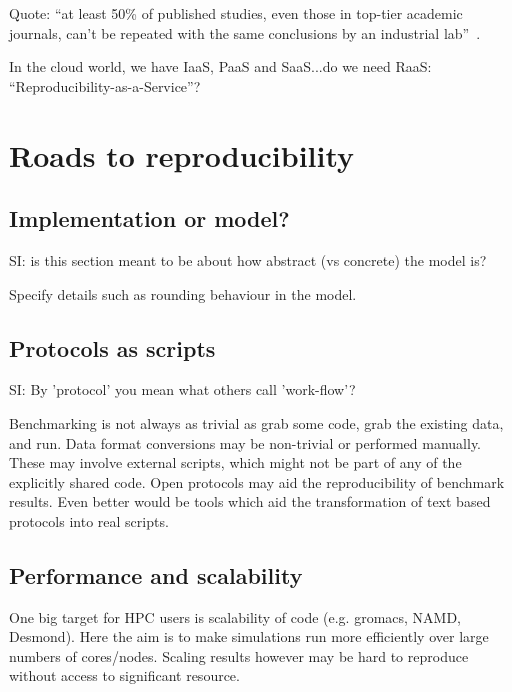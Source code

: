 \documentclass[conference]{IEEEtran}
\begin{document}
Quote: ``at least 50\% of published studies, even those in top-tier
academic journals, can't be repeated with the same conclusions by an
industrial lab''~\cite{osherovich:2011}.

In the cloud world, we have IaaS, PaaS and SaaS...do we need RaaS:
``Reproducibility-as-a-Service''?

\section{Roads to reproducibility}

\subsection{Implementation or model?}

SI: is this section meant to be about how abstract (vs concrete) the model is? 

Specify details such as rounding behaviour in the model.






\subsection{Protocols as scripts}

SI: By 'protocol' you mean what others call 'work-flow'? 

Benchmarking is not always as trivial as grab some code, grab the 
existing data, and run. Data format conversions may be non-trivial
or performed manually. These may involve external scripts, which 
might not be part of any of the explicitly shared code. Open 
protocols may aid the reproducibility of benchmark results. Even 
better would be tools which aid the transformation of text based
protocols into real scripts.


\subsection{Performance and scalability}

One big target for HPC users is scalability of code (e.g. gromacs,
NAMD, Desmond). Here the aim is to make simulations run more efficiently
over large numbers of cores/nodes. Scaling results however may be 
hard to reproduce without access to significant resource.
\end{document}
